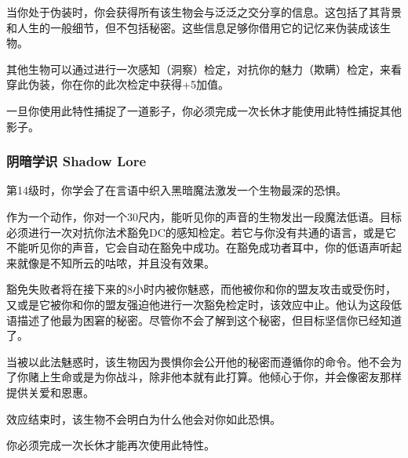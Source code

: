 当你处于伪装时，你会获得所有该生物会与泛泛之交分享的信息。这包括了其背景和人生的一般细节，但不包括秘密。这些信息足够你借用它的记忆来伪装成该生物。

其他生物可以通过进行一次感知（洞察）检定，对抗你的魅力（欺瞒）检定，来看穿此伪装，你在你的此次检定中获得+5加值。

一旦你使用此特性捕捉了一道影子，你必须完成一次长休才能使用此特性捕捉其他影子。
\subsubsection{阴暗学识 Shadow Lore}第14级时，你学会了在言语中织入黑暗魔法激发一个生物最深的恐惧。

作为一个动作，你对一个30尺内，能听见你的声音的生物发出一段魔法低语。目标必须进行一次对抗你法术豁免DC的感知检定。若它与你没有共通的语言，或是它不能听见你的声音，它会自动在豁免中成功。在豁免成功者耳中，你的低语声听起来就像是不知所云的咕哝，并且没有效果。

豁免失败者将在接下来的8小时内被你魅惑，而他被你和你的盟友攻击或受伤时，又或是它被你和你的盟友强迫他进行一次豁免检定时，该效应中止。他认为这段低语描述了他最为困窘的秘密。尽管你不会了解到这个秘密，但目标坚信你已经知道了。

当被以此法魅惑时，该生物因为畏惧你会公开他的秘密而遵循你的命令。他不会为了你赌上生命或是为你战斗，除非他本就有此打算。他倾心于你，并会像密友那样提供关爱和恩惠。

效应结束时，该生物不会明白为什么他会对你如此恐惧。

你必须完成一次长休才能再次使用此特性。
